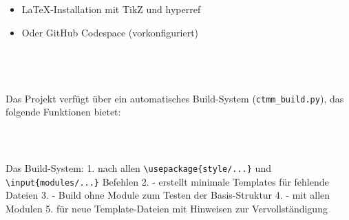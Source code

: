 \hypertarget{anforderungen}{%
\subsection{\textcolor{ctmmBlue}{\faBook~\1}}\label{anforderungen}}

\begin{itemize}[label=\textcolor{ctmmOrange}{\faArrowRight}]
\tightlist
\item
  LaTeX-Installation mit TikZ und hyperref
\item
  Oder GitHub Codespace (vorkonfiguriert)
\end{itemize}

\hypertarget{latex-hinweise-fuxfcr-entwickler}{%
\subsection{\textcolor{ctmmBlue}{\faBook~\1}}\label{latex-hinweise-fuxfcr-entwickler}}

\textbf{\textcolor{ctmmBlue}{\1}}

Das Projekt verfügt über ein automatisches Build-System (\texttt{ctmm\_build.py}), das folgende Funktionen bietet:

\hypertarget{automatisierte-build-pruxfcfung}{%
\subsubsection{\textcolor{ctmmGreen}{\faList~\1}}\label{automatisierte-build-pruxfcfung}}

\begin{Shaded}
\begin{Highlighting}\checkbox
{}
\end{Highlighting}
\end{Shaded}

Das Build-System: 1. \textbf{\textcolor{ctmmBlue}{\1}} nach allen \texttt{\textbackslash{}usepackage\{style/...\}} und \texttt{\textbackslash{}input\{modules/...\}} Befehlen 2. \textbf{\textcolor{ctmmBlue}{\1}} - erstellt minimale Templates für fehlende Dateien 3. \textbf{\textcolor{ctmmBlue}{\1}} - Build ohne Module zum Testen der Basis-Struktur 4. \textbf{\textcolor{ctmmBlue}{\1}} - mit allen Modulen 5. \textbf{\textcolor{ctmmBlue}{\1}} für neue Template-Dateien mit Hinweisen zur Vervollständigung

\hypertarget{modulare-test-strategie}{%
\subsubsection{\textcolor{ctmmGreen}{\faList~\1}}\label{modulare-test-strategie}}

